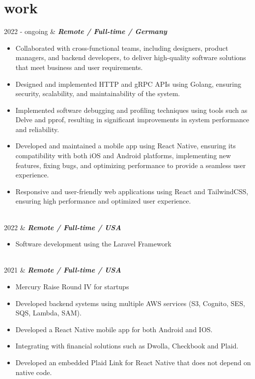 \documentclass[]{cv-mauri}
\begin{document}
\section*{work}
\begin{tabularcv}
	2022 - ongoing   &   
					\textbf{\textit{Remote / Full-time / Germany}}

			\begin{itemize}
				\item Collaborated with cross-functional teams, including designers, product managers, and backend developers, to deliver high-quality software solutions that meet business and user requirements.
				\item Designed and implemented HTTP and gRPC APIs using Golang, ensuring security, scalability, and maintainability of the system.
				\item Implemented software debugging and profiling techniques using tools such as Delve and pprof, resulting in significant improvements in system performance and reliability.
				\item Developed and maintained a mobile app using React Native, ensuring its compatibility with both iOS and Android platforms, implementing new features, fixing bugs, and optimizing performance to provide a seamless user experience.
				\item Responsive and user-friendly web applications using React and TailwindCSS, ensuring high performance and optimized user experience.
			\end{itemize}
					\\[\vspacepar]
	2022   &   
					\textbf{\textit{Remote / Full-time / USA}}

			\begin{itemize}
				\item Software development using the Laravel Framework 
			\end{itemize}
					\\[\vspacepar]
	2021   &   
					\textbf{\textit{Remote / Full-time / USA}}

			\begin{itemize}
				\item Mercury Raise Round IV for startups
				\item Developed backend systems using multiple AWS services (S3, Cognito, SES, SQS, Lambda, SAM).
				\item Developed a React Native mobile app for both Android and IOS.
				\item Integrating with financial solutions such as Dwolla, Checkbook and Plaid.
				\item  Developed an embedded Plaid Link for React Native that does not depend on native code.
			\end{itemize}
					\\[\vspacepar]
	

\end{tabularcv}
\end{document}
